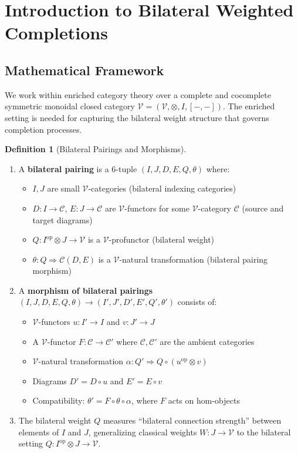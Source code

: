 \documentclass[11pt]{article}
\theoremstyle{plain}
\theoremstyle{definition}
\newtheorem{definition}[theorem]{Definition}
\theoremstyle{remark}
\newcommand{\V}{\mathcal{V}}
\newcommand{\C}{\mathcal{C}}
\newcommand{\op}{\mathrm{op}}
\newcommand{\tensor}{\otimes}
\begin{document}
\section{Introduction to Bilateral Weighted Completions}

\subsection{Mathematical Framework}

We work within enriched category theory over a complete and cocomplete symmetric monoidal closed category $\V = (\V, \tensor, I, [-,-])$. The enriched setting is needed for capturing the bilateral weight structure that governs completion processes.

\begin{definition}[Bilateral Pairings and Morphisms]\label{def:bilateral-pairing}
\mbox{} \bigskip
\begin{enumerate}
\item A \textbf{bilateral pairing} is a 6-tuple $(I, J, D, E, Q, \theta)$ where:
\begin{itemize}
\item $I, J$ are small $\V$-categories (bilateral indexing categories)
\item $D : I \to \C$, $E : J \to \C$ are $\V$-functors for some $\V$-category $\C$ (source and target diagrams)
\item $Q : I^{\op} \otimes J \to \V$ is a $\V$-profunctor (bilateral weight)
\item $\theta : Q \Rightarrow \C(D, E)$ is a $\V$-natural transformation (bilateral pairing morphism)
\end{itemize}

\item A \textbf{morphism of bilateral pairings} $(I, J, D, E, Q, \theta) \to (I', J', D', E', Q', \theta')$ consists of:
\begin{itemize}
\item $\V$-functors $u : I' \to I$ and $v : J' \to J$
\item A $\V$-functor $F : \C \to \C'$ where $\C, \C'$ are the ambient categories
\item $\V$-natural transformation $\alpha : Q' \Rightarrow Q \circ (u^{\op} \otimes v)$
\item Diagrams $D' = D \circ u$ and $E' = E \circ v$
\item Compatibility: $\theta' = F \circ \theta \circ \alpha$, where $F$ acts on hom-objects
\end{itemize}

\item The bilateral weight $Q$ measures ``bilateral connection strength'' between elements of $I$ and $J$, generalizing classical weights $W : J \to \V$ to the bilateral setting $Q : I^{\op} \otimes J \to \V$.
\end{enumerate}
\end{definition}
\end{document}
